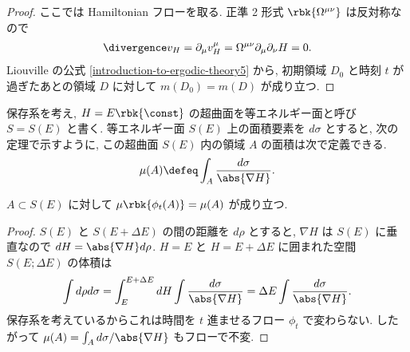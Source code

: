 \documentclass[openany, a4paper, oneside]{jsbook}
\begin{document}
\begin{proof}
ここでは Hamiltonian フローを取る.
正準 2 形式 $\rbk{\Omega^{\mu \nu}}$ は反対称なので
\begin{align}
 \divergence v_{H}
 =
 \partial_{\mu} v^{\mu}_H
 =
 \Omega^{\mu \nu} \partial_{\mu} \partial_{\nu} H
 = 0.
\end{align}
Liouville の公式 \ref{introduction-to-ergodic-theory5} から,
初期領域 $D_0$ と時刻 $t$ が過ぎたあとの領域 $D$ に対して
$m(D_0) = m(D)$ が成り立つ.
\end{proof}
保存系を考え, $H = E \rbk{ \const }$ の超曲面を等エネルギー面と呼び $S = S(E)$ と書く.
等エネルギー面 $S(E)$ 上の面積要素を $d \sigma$ とすると,
次の定理で示すように, この超曲面 $S(E)$ 内の領域 $A$ の面積は次で定義できる.
\begin{align}
 \mu (A)
 \defeq
 \int_{A} \frac{d \sigma}{\abs{\nabla H}}.
\end{align}
\begin{thm}\label{introduction-to-ergodic-theory20}
$A \subset S(E)$ に対して $\mu \rbk{\phi_t (A)} = \mu (A)$ が成り立つ.
\end{thm}
\begin{proof}
$S (E)$ と $S(E + \Delta E)$ の間の距離を $d \rho$ とすると,
$\nabla H$ は $S(E)$ に垂直なので $dH = \abs{\nabla H} d \rho$.
$H = E$ と $H = E + \Delta E$ に囲まれた空間 $S(E; \Delta E)$ の体積は
\begin{align}
 \int d \rho d \sigma
 =
 \int_{E}^{E + \Delta E} dH \int \frac{d \sigma}{\abs{\nabla H}}
 =
 \Delta E \int \frac{d \sigma}{\abs{\nabla H}}.
\end{align}
保存系を考えているからこれは時間を $t$ 進ませるフロー $\phi_t$ で変わらない.
したがって $\mu (A) = \int_A d \sigma / \abs{\nabla H}$ もフローで不変.
\end{proof}
\end{document}
